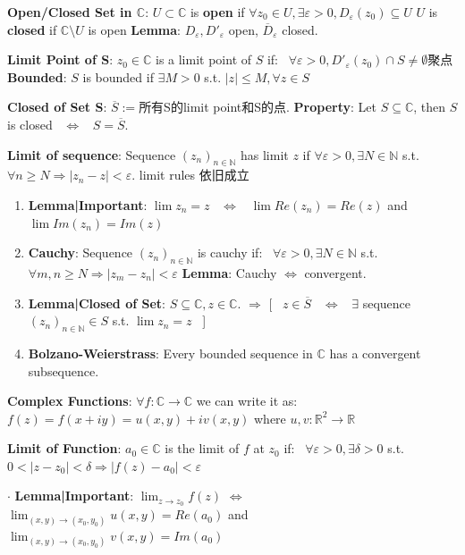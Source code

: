 \documentclass[9pt]{article}
\begin{document}
\textbf{Open/Closed Set in $\mathbb{C}$}: {\small $U\subset\mathbb{C}$ is \textbf{open} if $\forall z_0\in U,\exists\varepsilon>0,D_\varepsilon(z_0)\subseteq U$ \quad $U$ is \textbf{closed} if $\mathbb{C}\setminus U$ is open} \quad \textbf{Lemma}: $D_\varepsilon,D'_\varepsilon$ open, $\overline{D}_\varepsilon$ closed.

\textbf{Limit Point of S}: $z_0\in\mathbb{C}$ is a limit point of $S$ if: \ $\forall\varepsilon>0,D'_\varepsilon(z_0)\cap S\neq\emptyset${\tiny 聚点} \quad \quad \textbf{Bounded}: $S$ is bounded if $\exists M>0$ s.t. $|z|\leq M,\forall z\in S$

\textbf{Closed of Set S}: $\overline{S}:=$所有S的limit point和S的点. \quad \textbf{Property}: Let $S\subseteq\mathbb{C}$, then $S$ is closed \ $\Leftrightarrow$ \ $S=\overline{S}$.

\textbf{Limit of sequence}: Sequence $(z_n)_{n\in\mathbb{N}}$ has limit $z$ if $\forall\varepsilon>0,\exists N\in\mathbb{N}$ s.t. $\forall n\geq N\Rightarrow |z_n-z|<\varepsilon$. {\scriptsize limit rules 依旧成立}

\begin{enumerate}[itemsep=-2pt, topsep=-2pt]
    \item \textbf{Lemma|Important}: $\lim z_n=z$ \ $\Leftrightarrow$ \ $\lim Re(z_n)=Re(z)$ and $\lim Im(z_n)=Im(z)$
    \item \textbf{Cauchy}: Sequence $(z_n)_{n\in\mathbb{N}}$ is cauchy if: \ $\forall\varepsilon>0,\exists N\in\mathbb{N}$ s.t. $\forall m,n\geq N\Rightarrow |z_m-z_n|<\varepsilon$ \quad \textbf{Lemma}: Cauchy $\Leftrightarrow$ convergent.
    \item \textbf{Lemma|Closed of Set}: $S\subseteq\mathbb{C},z\in\mathbb{C}$. $\Rightarrow$ [ \ $z\in\overline{S}$ \ $\Leftrightarrow$ \ $\exists$ sequence $(z_n)_{n\in\mathbb{N}}\in S$ s.t. $\lim z_n=z$ \ ]
    \item \textbf{Bolzano-Weierstrass}: Every bounded sequence in $\mathbb{C}$ has a convergent subsequence.
\end{enumerate}

\textbf{Complex Functions}: $\forall f:\mathbb{C}\to\mathbb{C}$ we can write it as: $f(z)=f(x+iy)=u(x,y)+iv(x,y)$ where $u,v:\mathbb{R}^2\to\mathbb{R}$

\textbf{Limit of Function}: $a_0\in\mathbb{C}$ is the limit of $f$ at $z_0$ if: \ $\forall\varepsilon>0,\exists\delta>0$ s.t. $0<|z-z_0|<\delta\Rightarrow |f(z)-a_0|<\varepsilon$ 

$\cdot$ \textbf{Lemma|Important}: $\lim_{z\to z_0} f(z)$ $\Leftrightarrow$ $\lim_{(x,y)\to(x_0,y_0)} u(x,y)=Re(a_0)$ and $\lim_{(x,y)\to(x_0,y_0)} v(x,y)=Im(a_0)$
\end{document}
